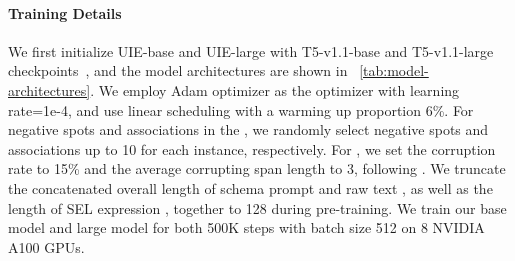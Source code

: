 \documentclass[11pt]{article}
\begin{document}
\begin{table}[t]
  \centering
  \caption{
    Detailed datasets statistics.
    |*| indicates the number of categories, and \# is the number of sentences in the specific subset.
    We take sentiment types as special relation type: positive, negative, and neutral; and each sentiment triplet holds a aspect and a opinion.
}
  \label{tab:details_datasets}
\end{table} 
\paragraph{Training Details}

We first initialize UIE-base and UIE-large with T5-v1.1-base and T5-v1.1-large checkpoints~\citep{2020t5}, and the model architectures are shown in \tablename~\ref{tab:model-architectures}.
We employ Adam optimizer \cite{Kingma2015adam} as the optimizer with learning rate=1e-4, and use linear scheduling with a warming up proportion 6\%.
For negative spots and associations in the , we randomly select negative spots and associations up to 10 for each instance, respectively.
For , we set the corruption rate to 15\% and the average corrupting span length to 3, following \citet{2020t5}.
We truncate the concatenated overall length of schema prompt  and raw text , as well as the length of SEL expression , together to 128 during pre-training.
We train our base model and large model for both 500K steps with batch size 512 on 8 NVIDIA A100 GPUs.
\end{document}
